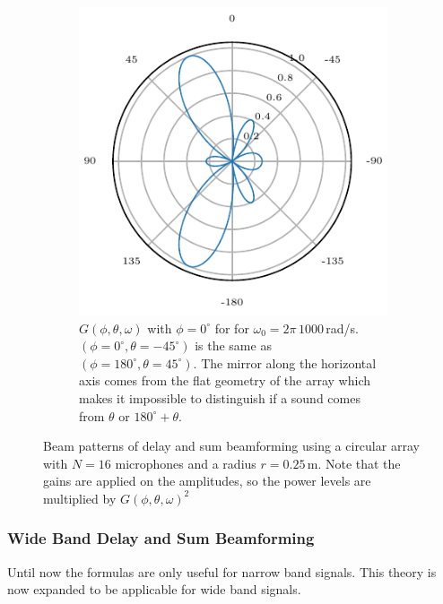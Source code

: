\begin{figure}[ht]
\begin{subfigure}[t]{0.45\textwidth}
		\includegraphics[width=\textwidth]{images/3_source_localization/radial_1200_circ_theta_single.pdf}
		\caption{\(G(\phi, \theta, \omega)\) with $\phi = 0^\circ$ for for $\omega_0 = 2\pi\, 1000$\,rad/s.
			$(\phi= 0^\circ, \theta = -45^\circ)$ is the same as $(\phi= 180^\circ, \theta = 45^\circ)$.
			The mirror along the horizontal axis comes from the flat geometry of the array which makes
			it impossible to distinguish if a sound comes from $\theta$ or $180^\circ + \theta$.}
		\label{ssl:fig:CircBmTheta}
	\end{subfigure}
	\caption{Beam patterns of delay and sum beamforming using a circular array with $N=16$ microphones
		and a radius $r = 0.25$\,m. Note that the gains are applied on the amplitudes, so the
		power levels are multiplied by $G(\phi, \theta, \omega)^2$}
	\label{ssl:fig:CircBmResponse}
\end{figure}

\subsubsection{Wide Band Delay and Sum Beamforming}
Until now the formulas are only useful for narrow band signals.
This theory is now expanded to be applicable for wide band signals.

